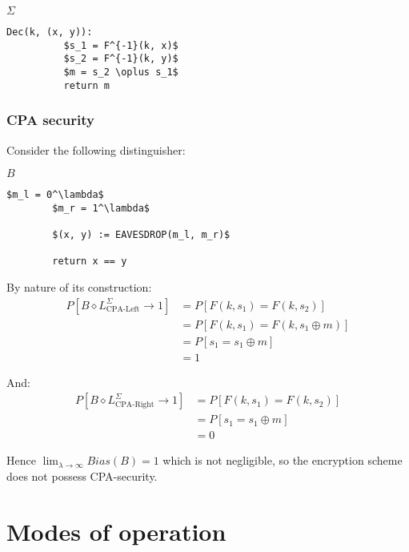 \documentclass[a4paper]{scrreprt}
\begin{document}
\begin{library}{$\Sigma$}
	\begin{lstlisting}[mathescape=true,autogobble=true]
		Dec(k, (x, y)):
		  $s_1 = F^{-1}(k, x)$
		  $s_2 = F^{-1}(k, y)$
		  $m = s_2 \oplus s_1$
		  return m
	\end{lstlisting}
\end{library}

\subsubsection{CPA security}

Consider the following distinguisher:

\begin{library}{$B$}
	\begin{lstlisting}[mathescape=true,autogobble=true]
		$m_l = 0^\lambda$
		$m_r = 1^\lambda$

		$(x, y) := EAVESDROP(m_l, m_r)$

		return x == y
	\end{lstlisting}
\end{library}

By nature of its construction:
\begin{align*}
	P[B \diamond L^{\Sigma}_{\text{CPA-Left}} \rightarrow 1] & = P[F(k, s_1) = F(k, s_2)] \\
	& = P[F(k, s_1) = F(k, s_1 \oplus m)] \\
	& = P[s_1 = s_1 \oplus m] \tag*{As F is deterministic} \\
	& = 1\tag*{As $x \oplus 0^\lambda = x$ for all $\lambda$-bit strings $x$}
\end{align*}

And:
\begin{align*}
	P[B \diamond L^{\Sigma}_{\text{CPA-Right}} \rightarrow 1] & = P[F(k, s_1) = F(k, s_2)] \\
	& = P[s_1 = s_1 \oplus m] \tag*{As F is deterministic} \\
	& = 0 \tag*{As $x \oplus 1^\lambda \neq x$ for all $\lambda$-bit strings $x$}
\end{align*}

Hence $\lim_{\lambda \to \infty} Bias(B) = 1$ which is not negligible,
so the encryption scheme does not possess CPA-security.

\section{Modes of operation}
\end{document}

